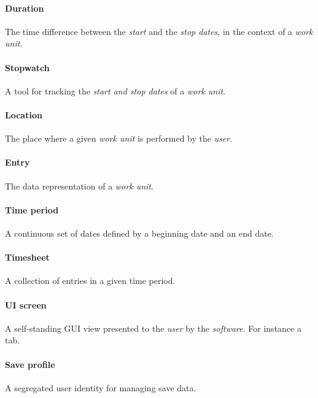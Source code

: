 \paragraph{Duration} The time difference between the \emph{start} and the
  \emph{stop dates}, in the context of a \emph{work unit}.
\paragraph{Stopwatch} A tool for tracking the \emph{start and stop dates} of
  a \emph{work unit}.
\paragraph{Location} The place where a given \emph{work unit} is performed
  by the \emph{user}.
\paragraph{Entry} The data representation of a \emph{work unit}.
\paragraph{Time period} A continuous set of dates defined by a beginning
  date and an end date.
\paragraph{Timesheet} A collection of entries in a given time period.
\paragraph{UI screen} A self-standing GUI view presented to the \emph{user} by
the \emph{software}. For instance a tab.
\paragraph{Save profile} A segregated user identity for managing save data.